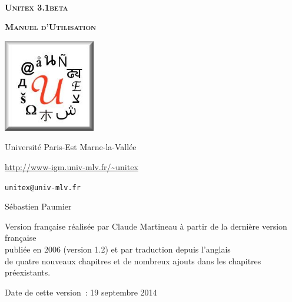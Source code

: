 
\begin{titlepage}
\begin{center}

~

\vspace{3cm}
\Huge
\textsc{\textbf{Unitex 3.1beta}}

\vspace{1cm}

\huge
\textsc{\textbf{Manuel d'Utilisation}}

\vspace{2cm}

  \begin{center}
    \includegraphics[width=4cm]{resources/img/logo-Unitex.png}
  \end{center}
\normalsize

\vspace{2cm}

\LARGE

Université Paris-Est Marne-la-Vallée
\bigskip
\normalsize

\url{http://www-igm.univ-mlv.fr/~unitex}

\verb$unitex@univ-mlv.fr$

\vspace{1cm}

Sébastien Paumier
\bigskip

Version française réalisée par Claude Martineau à partir de la dernière version française\\
publiée en 2006 (version 1.2) et par traduction depuis l'anglais\\
de quatre nouveaux chapitres et de nombreux ajouts dans les chapitres préexistants.
\bigskip

Date de cette version~: 19 septembre 2014

\end{center}

\end{titlepage}
